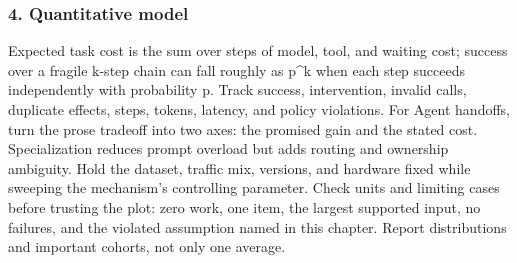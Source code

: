 \subsubsection*{4. Quantitative model}
Expected task cost is the sum over steps of model, tool, and waiting cost; success over a fragile k-step chain can fall roughly as p\textasciicircum{}k when each step succeeds independently with probability p. Track success, intervention, invalid calls, duplicate effects, steps, tokens, latency, and policy violations.
For Agent handoffs, turn the prose tradeoff into two axes: the promised gain and the stated cost. Specialization reduces prompt overload but adds routing and ownership ambiguity. Hold the dataset, traffic mix, versions, and hardware fixed while sweeping the mechanism's controlling parameter.
Check units and limiting cases before trusting the plot: zero work, one item, the largest supported input, no failures, and the violated assumption named in this chapter. Report distributions and important cohorts, not only one average.
